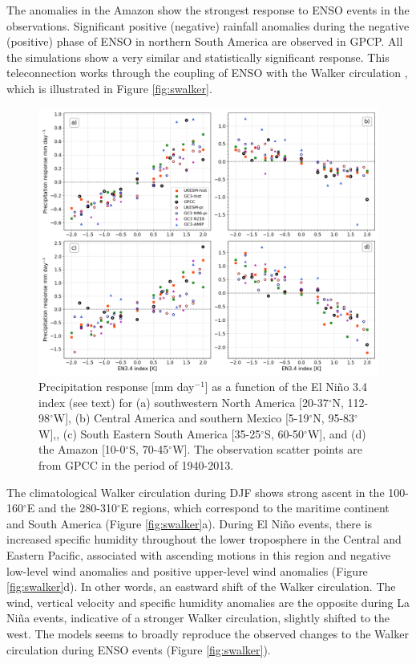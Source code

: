 The anomalies in the Amazon show the strongest response to ENSO events in the observations. Significant positive (negative) rainfall anomalies during the negative (positive) phase of ENSO in northern South America are observed in GPCP. All the simulations show a very similar and statistically significant response. This teleconnection works through the coupling of ENSO with the Walker circulation \citep{vera2006,cai2019pantropical}, which is illustrated in Figure \ref{fig:swalker}. 

\begin{figure}[t!]
\centering
 \includegraphics[width=\linewidth]{figures/fig_ensolinear}
\caption[Linearity of the precipitation response to ENSO events]{Precipitation response [mm day$^{-1}$] as a function of the El Ni\~no 3.4 index (see text) for (a) southwestern North America [20-37$^\circ$N, 112-98$^\circ$W], (b) Central America and southern Mexico [5-19$^\circ$N, 95-83$^\circ$W],, (c) South Eastern South America [35-25$^\circ$S, 60-50$^\circ$W], and (d) the Amazon [10-0$^\circ$S, 70-45$^\circ$W]. The observation scatter points are from GPCC in the period of 1940-2013.}
\label{fig:12}
\end{figure}

The climatological Walker circulation during DJF shows strong ascent in the 100-160$^\circ$E and the 280-310$^\circ$E regions, which correspond to the maritime continent and South America (Figure \ref{fig:swalker}a). During El Ni\~no events, there is increased specific humidity throughout the lower troposphere in the Central and Eastern Pacific, associated with ascending motions in this region and negative low-level wind anomalies and positive upper-level wind anomalies (Figure \ref{fig:swalker}d). In other words, an eastward shift of the Walker circulation. The wind, vertical velocity and specific humidity anomalies are the opposite during La Niña events, indicative of a stronger Walker circulation, slightly shifted to the west. 
The models seems to broadly reproduce the observed changes to the Walker circulation during ENSO events (Figure \ref{fig:swalker}).


